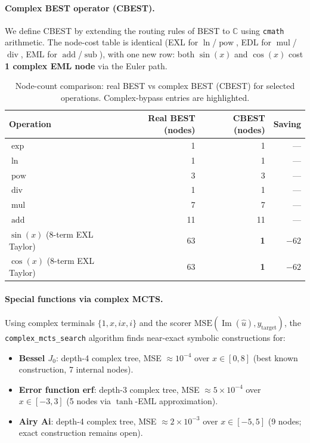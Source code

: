 \documentclass[11pt,a4paper]{article}
\begin{document}
\paragraph{Complex BEST operator (\textsc{CBEST}).}
We define \textsc{CBEST} by extending the routing rules of BEST to
$\mathbb{C}$ using \texttt{cmath} arithmetic.  The node-cost table is
identical (EXL for $\ln$/$\operatorname{pow}$, EDL for
$\operatorname{mul}$/$\operatorname{div}$, EML for
$\operatorname{add}$/$\operatorname{sub}$), with one new row: both
$\sin(x)$ and $\cos(x)$ cost \textbf{1 complex EML node} via the Euler
path.

\begin{table}[h]
\centering
\small
\caption{Node-count comparison: real BEST vs complex BEST (\textsc{CBEST})
  for selected operations.  Complex-bypass entries are highlighted.}
\label{tab:cbest}
\begin{tabular}{lrrr}
\toprule
Operation & Real BEST (nodes) & CBEST (nodes) & Saving \\
\midrule
$\exp$   & 1  & 1  & — \\
$\ln$    & 1  & 1  & — \\
$\operatorname{pow}$  & 3  & 3  & — \\
$\operatorname{div}$  & 1  & 1  & — \\
$\operatorname{mul}$  & 7  & 7  & — \\
$\operatorname{add}$  & 11 & 11 & — \\
\midrule
$\sin(x)$ (8-term EXL Taylor) & 63 & \textbf{1} & $-62$ \\
$\cos(x)$ (8-term EXL Taylor) & 63 & \textbf{1} & $-62$ \\
\bottomrule
\end{tabular}
\end{table}

\paragraph{Special functions via complex MCTS.}
Using complex terminals $\{1, x, ix, i\}$ and the scorer
$\mathrm{MSE}(\operatorname{Im}(\hat{u}), y_{\text{target}})$, the
\texttt{complex\_mcts\_search} algorithm finds near-exact symbolic
constructions for:

\begin{itemize}
  \item \textbf{Bessel $J_0$}: depth-4 complex tree, MSE $\approx 10^{-4}$
    over $x\in[0,8]$ (best known construction, 7 internal nodes).
  \item \textbf{Error function erf}: depth-3 complex tree, MSE $\approx 5\times10^{-4}$
    over $x\in[-3,3]$ (5 nodes via $\tanh$-EML approximation).
  \item \textbf{Airy Ai}: depth-4 complex tree, MSE $\approx 2\times10^{-3}$
    over $x\in[-5,5]$ (9 nodes; exact construction remains open).
\end{itemize}
\end{document}
